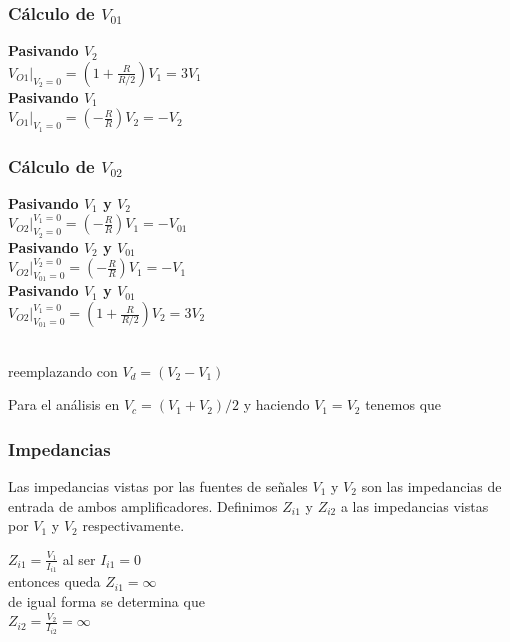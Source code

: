 \documentclass[11pt, a4paper]{article}
\begin{document}
\subsubsection{Cálculo de $V_{01}$}
\onehalfspacing
\begin{flushleft}
\textbf{Pasivando $V_2$}\\
$V_{O1}|_{V_2=0}=(1+\frac{R}{R/2})V_1=3V_1$ \\
\textbf{Pasivando $V_1$} \\
$V_{O1}|_{V_1=0}=(-\frac{R}{R})V_2=-V_2$ 
\end{flushleft}\begin{center}
\end{center}

\subsubsection{Cálculo de $V_{02}$}
\begin{flushleft}
\textbf{Pasivando $V_1$ y $V_2$}\\
$V_{O2}|^{V_1=0}_{V_2=0}=(-\frac{R}{R})V_1=-V_{01}$ \\
\textbf{Pasivando $V_2$ y $V_{01}$} \\
$V_{O2}|^{V_2=0}_{V_{01}=0}=(-\frac{R}{R})V_1=-V_1$ \\
\textbf{Pasivando $V_1$ y $V_{01}$} \\
$V_{O2}|^{V_1=0}_{V_{01}=0}=(1+\frac{R}{R/2})V_2=3V_2$ 
\end{flushleft}
\begin{center}
	\\
	reemplazando con $ V_d=(V_2-V_1)$ \\
\end{center}
\begin{flushleft}
	Para el análisis en $V_c=(V_1+V_2)/2$ y haciendo $V_1=V_2$ tenemos que \begin{center}
	\end{center}
\end{flushleft}
\subsubsection{Impedancias}
Las impedancias vistas por las fuentes de señales $V_1$ y $V_2$ son las impedancias de entrada de ambos amplificadores. Definimos $Z_{i1}$ y $Z_{i2}$ a las impedancias vistas por $V_1$ y $V_2$ respectivamente.
\begin{center}
	$Z_{i1}= \frac{V_1}{I_{i1}}$ al ser $I_{i1}=0$ \\
	entonces queda $Z_{i1}= \infty$\\
	de igual forma se determina que\\
	 $Z_{i2}=\frac{V_2}{I_{i2}}=\infty$
\end{center}
\end{document}
